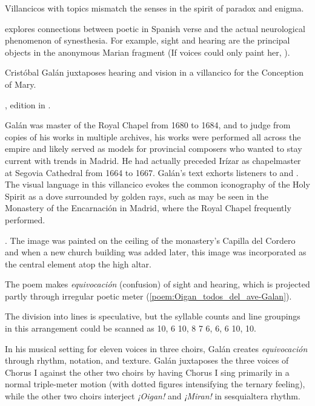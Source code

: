 Villancicos with  topics mismatch the senses in the spirit
of paradox and enigma.%
\begin{Footnote}
    \Autocite{DoetschKraus:Sinestesia} explores connections between poetic
     in Spanish verse and the actual
    neurological phenomenon of synesthesia.  
    For example, sight and hearing are the principal objects in the anonymous
    Marian fragment  (If voices
    could only paint her, ).
\end{Footnote}
Cristóbal Galán juxtaposes hearing and vision in a villancico for the Conception
of Mary.%
\begin{Footnote}
    , edition in \autocite[567--568]{CaberoPueyo:PhD}.
\end{Footnote}
Galán was master of the Royal Chapel from 1680 to 1684, and to judge from copies
of his works in multiple archives, his works were performed all across the
empire and likely served as models for provincial composers who wanted to stay
current with trends in Madrid.
He had actually preceded Irízar as chapelmaster at Segovia Cathedral from 1664
to 1667.%
    \Autocite{Baron-Sage:GalanC}
Galán's text exhorts listeners to  and .
The visual language in this villancico evokes the common iconography of the Holy
Spirit as a dove surrounded by golden rays, such as may be seen in the Monastery
of the Encarnación in Madrid, where the Royal Chapel frequently performed.%
\begin{Footnote}
    \Autocite[69--70, 81]{Sanz:GuiaDescalzasEncarnacion}.
    The image was painted on the ceiling of the monastery's Capilla del Cordero
    and when a new church building was added later, this image was incorporated
    as the central element atop the high altar.
\end{Footnote}
The poem makes \emph{equivocación} (confusion) of sight and hearing, which is
projected partly through irregular poetic meter
(\cref{poem:Oigan_todos_del_ave-Galan}).%
\begin{Footnote}
    The division into lines is speculative, but the syllable counts and line
    groupings in this arrangement could be scanned as  10, 6 10, 8 7 6, 6, 6 10,
    10.
\end{Footnote}
In his musical setting for eleven voices in three choirs, Galán creates
\emph{equivocación} through rhythm, notation, and texture.  
Galán juxtaposes the three voices of Chorus I against the other two choirs by
having Chorus I sing primarily in a normal triple-meter motion (with dotted
figures intensifying the ternary feeling), while the other two choirs interject
\emph{¡Oigan!} and \emph{¡Miran!} in sesquialtera rhythm.

